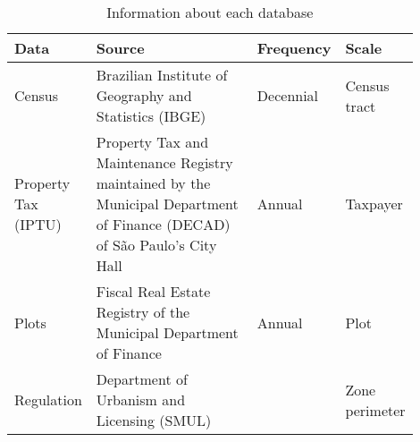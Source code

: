 \begin{table}[h!]
    \centering
    \caption{Information about each database}

    {\small
    \begin{tabular}{>{\raggedright\arraybackslash}p{0.125\linewidth} >{\raggedright\arraybackslash}p{0.50\linewidth} >{\centering\arraybackslash}p{0.125\linewidth} >{\raggedright\arraybackslash}p{0.15\linewidth}}
        \textbf{Data} & \textbf{Source} & \textbf{Frequency} & \textbf{Scale} \\
        \midrule
        Census & Brazilian Institute of Geography and Statistics (IBGE) & Decennial & Census tract \\
        Property Tax (IPTU) & Property Tax and Maintenance Registry maintained by the Municipal Department of Finance (DECAD) of São Paulo's City Hall & Annual & Taxpayer \\
        Plots & Fiscal Real Estate Registry of the Municipal Department of Finance & Annual & Plot \\
        Regulation & Department of Urbanism and Licensing (SMUL) & 2014 & Zone perimeter \\
        \bottomrule
    \end{tabular}
    }
    \label{tab:datasets}
\end{table}
